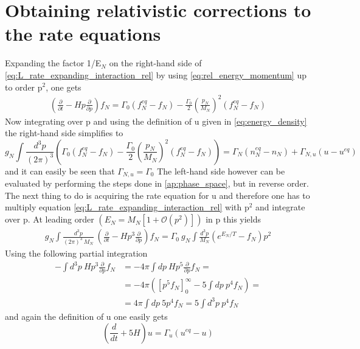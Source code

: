 \section{Obtaining relativistic corrections to the rate equations}
\label{ap:rel_corrections}
Expanding the factor 1/E$_N$ on the right-hand side of \ref{eq:L_rate_expanding_interaction_rel} by using \ref{eq:rel_energy_momentum} up to order p$^2$, one gets
\begin{align*}
		\left(\frac{\partial}{\partial t}-Hp\frac{\partial}{\partial p}\right)f_N=\Gamma_0\left(f_N^{eq}-f_N\right)-\frac{\Gamma_0}{2}\left(\frac{p_N}{M_N}\right)^2\left(f_N^{eq}-f_N\right)
\end{align*}
Now integrating over p and using the definition of u given in \ref{eq:energy_density} the right-hand side simplifies to
\begin{equation*}
	g_N\int \frac{d^3p}{(2\pi)^3}\left(\Gamma_0\left(f_N^{eq}-f_N\right)-\frac{\Gamma_0}{2}\left(\frac{p_N}{M_N}\right)^2\left(f_N^{eq}-f_N\right)\right)=\Gamma_N\left(n_N^{eq}-n_N\right)+\Gamma_{N,u}\left(u-u^{eq}\right)
\end{equation*}
and it can easily be seen that $\Gamma_{N,u}=\Gamma_{0}$ \newline
The left-hand side however can be evaluated by performing the steps done in \ref{ap:phase_space}, but in reverse order. \newline
The next thing to do is acquiring the rate equation for u and therefore one has to multiply equation \ref{eq:L_rate_expanding_interaction_rel} with p$^2$ and integrate over p. At leading order $\left(E_N=M_N\left[1+\mathcal{O}(p^2)\right]\right)$ in p this yields
\begin{align*}
	g_N\int \frac{d^3p}{(2\pi)^3\:M_N}\:\left(\frac{\partial}{\partial t}-Hp^3\frac{\partial}{\partial p}\right)f_N=\Gamma_0\:g_N\int \frac{d^3p}{M_N}\left(e^{E_N/T}-f_N\right)p^2
\end{align*}
Using the following partial integration
\begin{align*}
	-\int d^3p\:Hp^3\frac{\partial}{\partial p}f_N&=-4\pi\int dp\:Hp^5\frac{\partial}{\partial p}f_N=\\
	&=-4\pi\left(\left[p^5f_N\right]_0^\infty-5\int dp\: p^4f_N\right)=\\
	&=4\pi\int dp\: 5p^4f_N=5\int d^3p\: p^4f_N
\end{align*}
and again the definition of u one easily gets
\begin{equation*}
	\left(\frac{d}{dt}+5H\right)u=\Gamma_u\left(u^{eq}-u\right)
\end{equation*}

